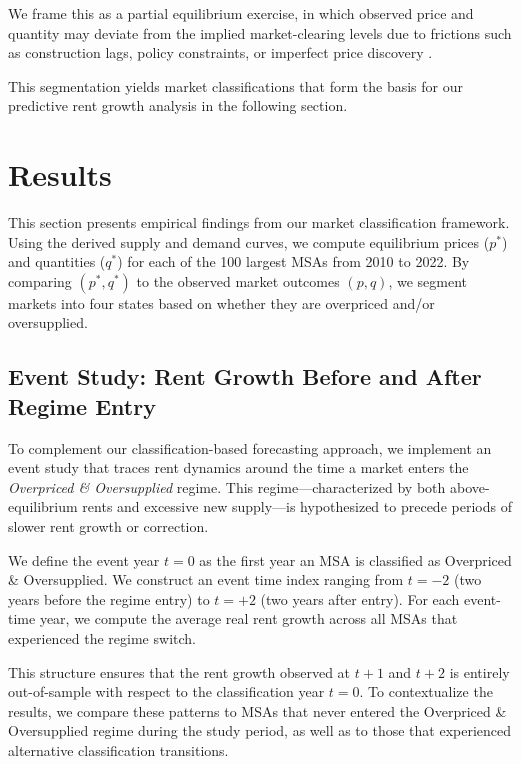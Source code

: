 \documentclass[APA,Times1COL]{WileyNJDv5} %
\begin{document}
We frame this as a partial equilibrium exercise, in which observed price and quantity may deviate from the implied market-clearing levels due to frictions such as construction lags, policy constraints, or imperfect price discovery \cite{wheaton1991realestate, glaeser2019rethinking}.



This segmentation yields market classifications that form the basis for our predictive rent growth analysis in the following section.

\section{Results}


This section presents empirical findings from our market classification framework. Using the derived supply and demand curves, we compute equilibrium prices (\( p^* \)) and quantities (\( q^* \)) for each of the 100 largest MSAs from 2010 to 2022. By comparing \( (p^*, q^*) \) to the observed market outcomes \( (p, q) \), we segment markets into four states based on whether they are overpriced and/or oversupplied.


\subsection{Event Study: Rent Growth Before and After Regime Entry}

To complement our classification-based forecasting approach, we implement an event study that traces rent dynamics around the time a market enters the \emph{Overpriced \& Oversupplied} regime. This regime—characterized by both above-equilibrium rents and excessive new supply—is hypothesized to precede periods of slower rent growth or correction.

We define the event year $t=0$ as the first year an MSA is classified as Overpriced \& Oversupplied. We construct an event time index ranging from $t = -2$ (two years before the regime entry) to $t = +2$ (two years after entry). For each event-time year, we compute the average real rent growth across all MSAs that experienced the regime switch.

This structure ensures that the rent growth observed at $t+1$ and $t+2$ is entirely out-of-sample with respect to the classification year $t=0$. To contextualize the results, we compare these patterns to MSAs that never entered the Overpriced \& Oversupplied regime during the study period, as well as to those that experienced alternative classification transitions.
\end{document}
